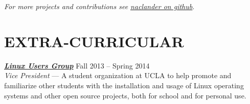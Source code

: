 \documentclass[line,letterpaper]{resume}
\begin{document}
\begin{resume}
    \hfill \emph{For more projects and contributions see
    \underline{\href{https://github.com/naclander}{naclander on github}}}.

    \vspace{-15pt}

\section{\uppercase{Extra-Curricular}}
    {\sl\textbf{\href{http://linux.ucla.edu}{Linux Users Group}}} \hfill Fall 2013 -- Spring 2014\\
    \emph{Vice President} --- A student organization at UCLA to help promote
	and familiarize other students with the installation and usage of Linux
	operating systems and other open source projects, both for school and for personal use.


   \end{resume}
\end{document}
